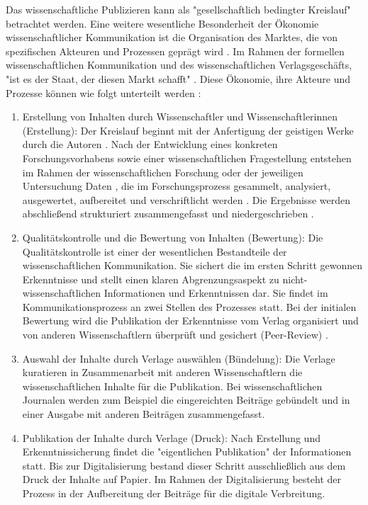 Das wissenschaftliche Publizieren kann als "gesellschaftlich bedingter Kreislauf" \cite{schirmbacher_2009_wisspub} betrachtet werden. Eine weitere wesentliche Besonderheit der Ökonomie wissenschaftlicher Kommunikation ist die Organisation des Marktes, die von spezifischen Akteuren und Prozessen geprägt wird \cite{Hess_2006}. Im Rahmen der formellen wissenschaftlichen Kommunikation und des wissenschaftlichen Verlagsgeschäfts, "ist es der Staat, der diesen Markt schafft" \cite{Hirschi_2015_buch_oa}. Diese Ökonomie, ihre Akteure und Prozesse können wie folgt unterteilt werden \cite{cite:11b} \cite{Hess_2006}:
\begin{enumerate}
\item Erstellung von Inhalten durch Wissenschaftler und Wissenschaftlerinnen (Erstellung): Der Kreislauf beginnt mit der Anfertigung der geistigen Werke durch die Autoren \cite{schirmbacher_2009_wisspub}. Nach der Entwicklung eines konkreten Forschungsvorhabens sowie einer wissenschaftlichen Fragestellung entstehen im Rahmen der wissenschaftlichen Forschung oder der jeweiligen Untersuchung Daten \cite{cite:11c}, die im Forschungsprozess gesammelt, analysiert, ausgewertet, aufbereitet und verschriftlicht werden \cite{cite:11d}. Die Ergebnisse werden abschließend strukturiert zusammengefasst und niedergeschrieben \cite{Hess_2006}.
\item Qualitätskontrolle und die Bewertung von Inhalten (Bewertung):
Die Qualitätskontrolle ist einer der wesentlichen Bestandteile der wissenschaftlichen Kommunikation. Sie sichert die im ersten Schritt gewonnen Erkenntnisse \cite{cite:11e} und stellt einen klaren Abgrenzungsaspekt zu nicht-wissenschaftlichen Informationen und Erkenntnissen dar\cite{cite:11f}. Sie findet im Kommunikationsprozess an zwei Stellen des Prozesses statt. Bei der initialen Bewertung wird die Publikation der Erkenntnisse vom Verlag organisiert \cite{schirmbacher_2009_wisspub} und von anderen Wissenschaftlern überprüft und gesichert (Peer-Review) \cite{Hess_2006}.
\item Auswahl der Inhalte durch Verlage auswählen (Bündelung):
Die Verlage kuratieren in Zusammenarbeit mit anderen Wissenschaftlern die wissenschaftlichen Inhalte für die Publikation. Bei wissenschaftlichen Journalen werden zum Beispiel die eingereichten Beiträge gebündelt und in einer Ausgabe mit anderen Beiträgen zusammengefasst.
\item Publikation der Inhalte durch Verlage (Druck):
Nach Erstellung und Erkenntnissicherung findet die "eigentlichen Publikation" \cite{schirmbacher_2009_wisspub} der Informationen statt. Bis zur Digitalisierung bestand dieser Schritt ausschließlich aus dem Druck der Inhalte auf Papier.\cite{cite:11h} Im Rahmen der Digitalisierung besteht der Prozess in der Aufbereitung der Beiträge für die digitale Verbreitung.

\end{enumerate}
